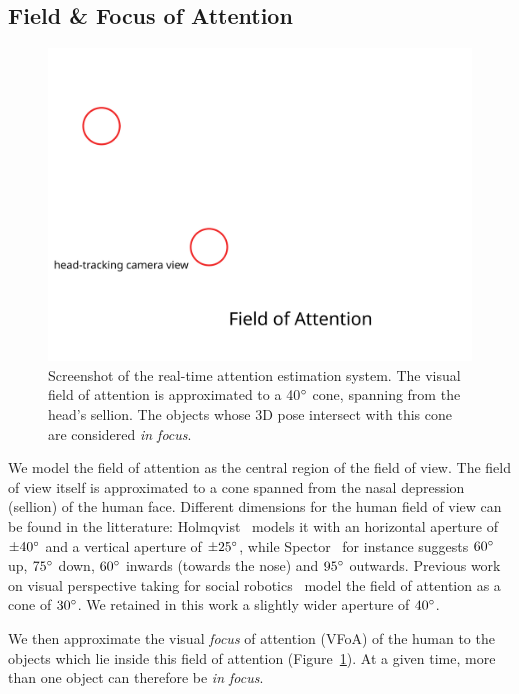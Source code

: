\documentclass{sig-alternate}
\begin{document}
\subsection{Field \& Focus of Attention}

\begin{figure}
    \centering
    \includegraphics[width=0.9\columnwidth]{field_of_attention}
    \caption{\small Screenshot of the real-time attention estimation system. The
    visual field of attention is approximated to a 40$\degree$ cone, spanning
    from the head's sellion. The objects whose 3D pose intersect with this cone are
    considered \emph{in focus}.}

    \label{fig:vfoa}
\end{figure}

We model the field of attention as the central region of the field of view.  The
field of view itself is approximated to a cone spanned from the nasal depression
(sellion) of the human face. Different dimensions for the human field of view
can be found in the litterature: Holmqvist~\cite{holmqvist2011eye} models it
with an horizontal aperture of $ \pm 40\degree $ and a vertical aperture of $
\pm 25\degree $, while Spector~\cite{walker1980clinical} for instance suggests
$60\degree$ up, $75\degree$ down, $60\degree$ inwards (towards the nose) and
$95\degree$ outwards.  Previous work on visual perspective taking for social
robotics~\cite{sisbot2011situation} model the field of attention as a cone of
$30\degree$. We retained in this work a slightly wider aperture of $40\degree$.

We then approximate the visual \emph{focus} of attention (VFoA) of the human to
the objects which lie inside this field of attention (Figure~\ref{fig:vfoa}). At
a given time, more than one object can therefore be \emph{in focus}.
\end{document}
